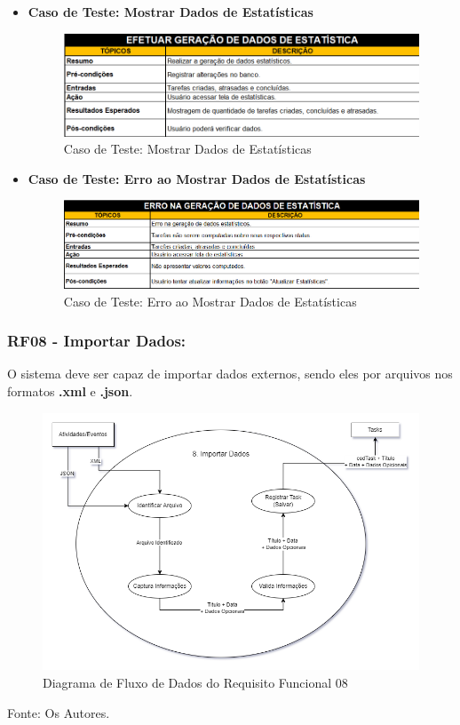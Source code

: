 \documentclass[a4paper,12pt]{article}
\begin{document}
\begin{itemize}
	\item\textbf{Caso de Teste: Mostrar Dados de Estatísticas}
	\begin{figure}
		\centering
		\includegraphics[scale=0.32]{UnitTest/trueCase/stats.png}
		\caption{Caso de Teste: Mostrar Dados de Estatísticas}
	\end{figure}
	\item\textbf{Caso de Teste: Erro ao Mostrar Dados de Estatísticas}
	\begin{figure}
		\centering
		\includegraphics[scale=0.32]{UnitTest/falseCase/stats.png}
		\caption{Caso de Teste: Erro ao Mostrar Dados de Estatísticas}
	\end{figure}
\end{itemize}

\pagebreak
\subsubsection{RF08 - Importar Dados:}
O sistema deve ser capaz de importar dados externos, sendo eles por arquivos nos formatos \textbf{.xml} e \textbf{.json}.
\begin{figure}[H]
	\centering
	\includegraphics[scale=0.45]{DFDs/RF08.drawio.png}
	\caption{Diagrama de Fluxo de Dados do Requisito Funcional 08}
\end{figure}
\noindent Fonte: Os Autores.
\end{document}
